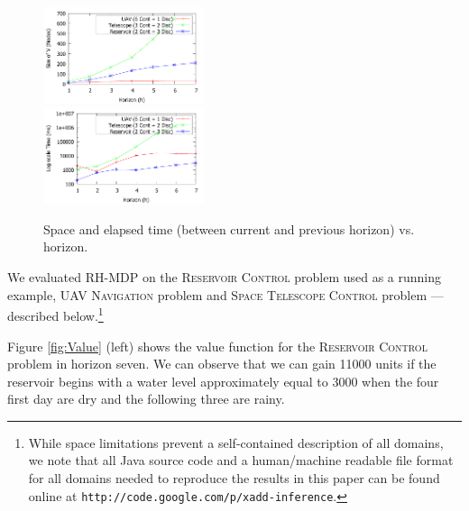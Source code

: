 \begin{figure}[tbp!]
\vspace{-2mm}
\centering

\includegraphics[width=0.42\textwidth]{Figures/Nodes.pdf}\\
\vspace{-2mm}
\includegraphics[width=0.42\textwidth]{Figures/Time.pdf}

\vspace{-2mm}
\caption{\footnotesize Space and elapsed time (between current and previous horizon) vs. horizon.
}
\label{fig:SpaceTime}
\vspace{-4mm}
\end{figure}

\label{sec:results}

We evaluated RH-MDP on the \textsc{Reservoir Control} problem used as a running example,
\textsc{UAV Navigation} problem  and
\textsc{Space Telescope Control} problem --- described below.\footnote{While
space limitations prevent a self-contained
description of all domains, we note that all Java source code and a
human/machine readable file format for all domains needed to reproduce
the results in this paper can be found online at
\texttt{http://code.google.com/p/xadd-inference}.}

Figure \ref{fig:Value} (left) shows the value function for the \textsc{Reservoir Control} problem in horizon seven. We can observe that we can gain  11000 units if the reservoir begins with a water level approximately equal to 3000 when the four first day are dry and the following three are rainy.


